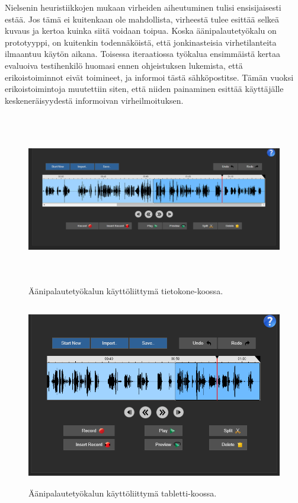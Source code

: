 \documentclass[utf8]{gradu3}
\begin{document}
Nielsenin heuristiikkojen mukaan virheiden aiheutuminen tulisi ensisijaisesti estää. Jos tämä  ei kuitenkaan ole mahdollista, virheestä tulee esittää selkeä kuvaus ja kertoa kuinka siitä voidaan toipua. Koska äänipalautetyökalu on prototyyppi, on kuitenkin todennäköistä, että jonkinasteisia virhetilanteita ilmaantuu käytön aikana. Toisessa iteraatiossa työkalua ensimmäistä kertaa evaluoiva testihenkilö huomasi ennen ohjeistuksen lukemista, että erikoistoiminnot eivät toimineet, ja informoi tästä sähköpostitse. Tämän vuoksi erikoistoimintoja muutettiin siten, että niiden painaminen esittää käyttäjälle keskeneräisyydestä informoivan virheilmoituksen.

\begin{figure}[H]\centering
  \begin{adjustwidth}{-2.2cm}{}
  \includegraphics[height=7.5cm,keepaspectratio]{UI}
  \caption{Äänipalautetyökalun käyttöliittymä tietokone-koossa.}
  \label{fig:UI}
  \end{adjustwidth}
\end{figure}

\begin{figure}[H]\centering
  \includegraphics[height=8cm,keepaspectratio]{UI_tablet}
  \caption{Äänipalautetyökalun käyttöliittymä tabletti-koossa. }
  \label{fig:UI_tablet}
\end{figure}
\end{document}
